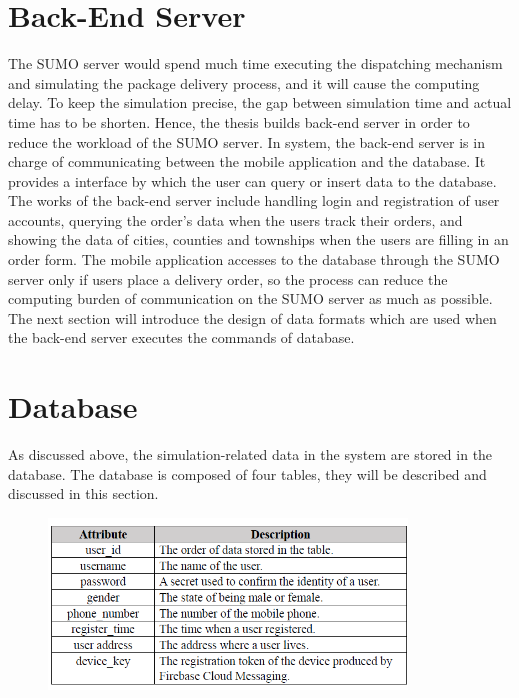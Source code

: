 \documentclass[12pt]{ksthesis}
\begin{document}
\begin{thesis}
{\section{Back-End Server}
The SUMO server would spend much time executing the dispatching mechanism and simulating the package delivery process, and it will cause the computing delay. To keep the simulation precise, the gap between simulation time and actual time has to be shorten. Hence, the thesis builds back-end server in order to reduce the workload of the SUMO server. In system, the back-end server is in charge of communicating between the mobile application and the database. It provides a interface by which the user can query or insert data to the database. The works of the back-end server include handling login and registration of user accounts, querying the order's data when the users track their orders, and showing the data of cities, counties and townships when the users are filling in an order form. 
The mobile application accesses to the database through the SUMO server only if users place a delivery order, so the process can reduce the computing burden of communication on the SUMO server as much as possible. The next section will introduce the design of data formats which are used when the back-end server executes the commands of database.




\section{Database}
As discussed above, the simulation-related data in the system are stored in the database. The database is composed of four tables, they will be described and discussed in this section.

\begin{figure}[t]
\centering
{}
\includegraphics[width=0.85\textwidth]{./figures/Table3-1-UserTable.PNG}

\vspace{0.5cm}
\label{Fig:UserTable}
\end{figure}

}
\end{thesis}
\end{document}
